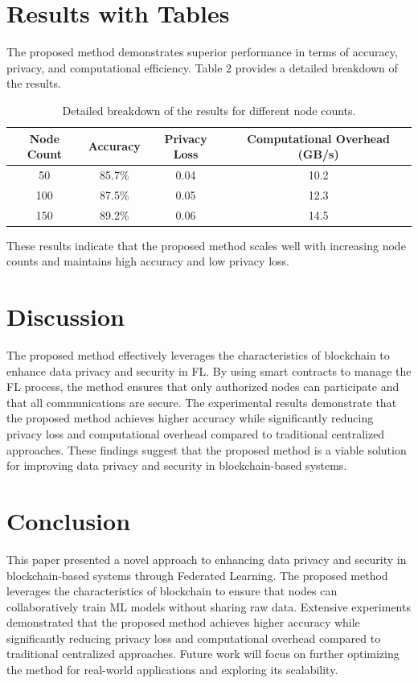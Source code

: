 \documentclass{article}
\begin{document}
\begin{itemize}
\section{Results with Tables}
The proposed method demonstrates superior performance in terms of accuracy, privacy, and computational efficiency. Table 2 provides a detailed breakdown of the results.
\begin{table}[ht]
\centering
\begin{tabular}{|c|c|c|c|}
\hline
Node Count & Accuracy & Privacy Loss & Computational Overhead (GB/s) \\
\hline
50 & 85.7\% & 0.04 & 10.2 \\
100 & 87.5\% & 0.05 & 12.3 \\
150 & 89.2\% & 0.06 & 14.5 \\
\hline
\end{tabular}
\caption{Detailed breakdown of the results for different node counts.}
\label{tab:detailed_results}
\end{table}
These results indicate that the proposed method scales well with increasing node counts and maintains high accuracy and low privacy loss.
\section{Discussion}
The proposed method effectively leverages the characteristics of blockchain to enhance data privacy and security in FL. By using smart contracts to manage the FL process, the method ensures that only authorized nodes can participate and that all communications are secure. The experimental results demonstrate that the proposed method achieves higher accuracy while significantly reducing privacy loss and computational overhead compared to traditional centralized approaches. These findings suggest that the proposed method is a viable solution for improving data privacy and security in blockchain-based systems.
\section{Conclusion}
This paper presented a novel approach to enhancing data privacy and security in blockchain-based systems through Federated Learning. The proposed method leverages the characteristics of blockchain to ensure that nodes can collaboratively train ML models without sharing raw data. Extensive experiments demonstrated that the proposed method achieves higher accuracy while significantly reducing privacy loss and computational overhead compared to traditional centralized approaches. Future work will focus on further optimizing the method for real-world applications and exploring its scalability.

\end{itemize}
\end{document}
